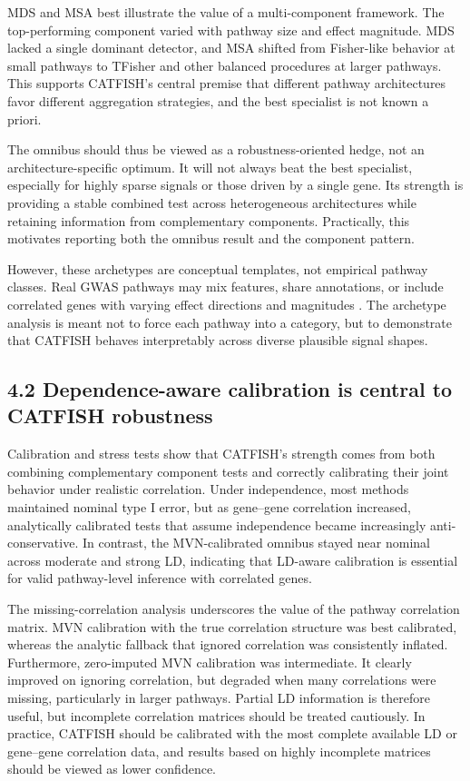 \documentclass[unnumsec,webpdf,contemporary,large]{oup-authoring-template}%
\theoremstyle{thmstyleone}%
\theoremstyle{thmstyletwo}%
\theoremstyle{thmstylethree}%
\begin{document}
MDS and MSA best illustrate the value of a multi-component framework. The top-performing component varied with pathway size and effect magnitude. MDS lacked a single dominant detector, and MSA shifted from Fisher-like behavior at small pathways to TFisher and other balanced procedures at larger pathways. This supports CATFISH's central premise that different pathway architectures favor different aggregation strategies, and the best specialist is not known a priori.

The omnibus should thus be viewed as a robustness-oriented hedge, not an architecture-specific optimum. It will not always beat the best specialist, especially for highly sparse signals or those driven by a single gene. Its strength is providing a stable combined test across heterogeneous architectures while retaining information from complementary components. Practically, this motivates reporting both the omnibus result and the component pattern.

However, these archetypes are conceptual templates, not empirical pathway classes. Real GWAS pathways may mix features, share annotations, or include correlated genes with varying effect directions and magnitudes \citep{White2019,Smith2022MetaboliteGWAS}. The archetype analysis is meant not to force each pathway into a category, but to demonstrate that CATFISH behaves interpretably across diverse plausible signal shapes.


\subsection*{4.2 Dependence-aware calibration is central to CATFISH robustness}

Calibration and stress tests show that CATFISH's strength comes from both combining complementary component tests and correctly calibrating their joint behavior under realistic correlation. Under independence, most methods maintained nominal type I error, but as gene--gene correlation increased, analytically calibrated tests that assume independence became increasingly anti-conservative. In contrast, the MVN-calibrated omnibus stayed near nominal across moderate and strong LD, indicating that LD-aware calibration is essential for valid pathway-level inference with correlated genes.

The missing-correlation analysis underscores the value of the pathway correlation matrix. MVN calibration with the true correlation structure was best calibrated, whereas the analytic fallback that ignored correlation was consistently inflated. Furthermore, zero-imputed MVN calibration was intermediate. It clearly improved on ignoring correlation, but degraded when many correlations were missing, particularly in larger pathways. Partial LD information is therefore useful, but incomplete correlation matrices should be treated cautiously. In practice, CATFISH should be calibrated with the most complete available LD or gene--gene correlation data, and results based on highly incomplete matrices should be viewed as lower confidence.
\end{document}
